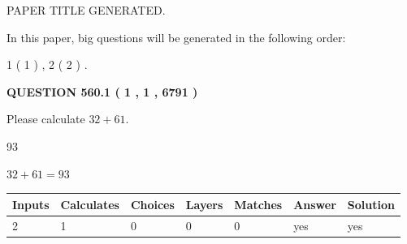 \documentclass[12pt]{article}
\begin{document}
   
   
   
   
   
 \vspace{0.2in}
 
 
 
 
   
   
 PAPER TITLE GENERATED.
   
   
   
\vspace{0.2in}
   
In this paper, big questions will be generated in the following order: 
   
   
   1 ( 1 )
 ,
   2 ( 2 )
 .
  
\vspace{0.2in}
  
{\textbf{\Large{QUESTION
560.1 
 ( 1 , 1 , 6791 )
}}}
  
  
 
Please calculate $ %
32 +  %
61 $.
 
 
 
\noindent{}
 
 

93
 
 
\noindent{}
 
 

 
 
 
\noindent{}
 
 

$ %
32 +  %
61=   %
93$
 
 
\noindent{}
 
 

 
   
   
   
   
\noindent\begin{tabular}{|l|l|l|l|l|l|l|}
 \hline
Inputs & Calculates & Choices & Layers & Matches & Answer & Solution \\ \hline
 2  & 
 1  & 
 0
  & 
 0  & 
 0  & 
  yes & 
  yes 
  \\ \hline
 \end{tabular}
   
   
   
   
\noindent{}
   
\end{document}
